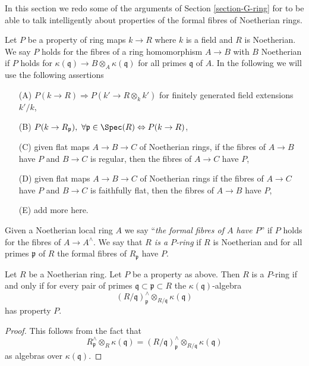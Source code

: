 \noindent
In this section we redo some of the arguments of Section \ref{section-G-ring}
for to be able to talk intelligently about
properties of the formal fibres of Noetherian rings.

\medskip\noindent
Let $P$ be a property of ring maps $k \to R$ where $k$ is a field and
$R$ is Noetherian. We say $P$ holds for the fibres of a ring homomorphism
$A \to B$ with $B$ Noetherian if $P$ holds for
$\kappa(\mathfrak q) \to B \otimes_A \kappa(\mathfrak q)$
for all primes $\mathfrak q$ of $A$.
In the following we will use the following assertions
\begin{enumerate}
\item[(A)] $P(k \to R) \Rightarrow P(k' \to R \otimes_k k')$ for
finitely generated field extensions $k'/k$,
\item[(B)] $P(k \to R_\mathfrak p),\ \forall \mathfrak p \in \Spec(R)
\Leftrightarrow P(k \to R)$,
\item[(C)] given flat maps $A \to B \to C$ of Noetherian
rings, if the fibres of $A \to B$ have $P$ and $B \to C$ is regular,
then the fibres of $A \to C$ have $P$,
\item[(D)] given flat maps $A \to B \to C$ of Noetherian
rings if the fibres of $A \to C$ have $P$ and $B \to C$ is faithfully
flat, then the fibres of $A \to B$ have $P$,
\item[(E)] add more here.
\end{enumerate}
Given a Noetherian local ring $A$ we say
``{\it the formal fibres of $A$ have $P$}'' if $P$ holds for
the fibres of $A \to A^\wedge$.
We say that {\it $R$ is a $P$-ring} if $R$ is Noetherian and for all
primes $\mathfrak p$ of $R$ the formal fibres of $R_\mathfrak p$ have $P$.

\begin{lemma}
\label{lemma-check-P-ring-easy}
Let $R$ be a Noetherian ring. Let $P$ be a property as above.
Then $R$ is a $P$-ring if and only if
for every pair of primes $\mathfrak q \subset \mathfrak p \subset R$
the $\kappa(\mathfrak q)$-algebra
$$
(R/\mathfrak q)_\mathfrak p^\wedge \otimes_{R/\mathfrak q} \kappa(\mathfrak q)
$$
has property $P$.
\end{lemma}

\begin{proof}
This follows from the fact that
$$
R_\mathfrak p^\wedge \otimes_R \kappa(\mathfrak q) =
(R/\mathfrak q)_\mathfrak p^\wedge \otimes_{R/\mathfrak q} \kappa(\mathfrak q)
$$
as algebras over $\kappa(\mathfrak q)$.
\end{proof}

